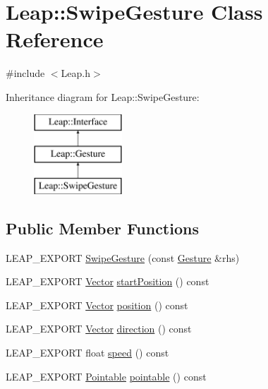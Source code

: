 \hypertarget{class_leap_1_1_swipe_gesture}{\section{Leap\+:\+:Swipe\+Gesture Class Reference}
\label{class_leap_1_1_swipe_gesture}
}


{\ttfamily \#include $<$Leap.\+h$>$}

Inheritance diagram for Leap\+:\+:Swipe\+Gesture\+:\begin{figure}[H]
\begin{center}
\leavevmode
\includegraphics[height=3.000000cm]{class_leap_1_1_swipe_gesture}
\end{center}
\end{figure}
\subsection*{Public Member Functions}
\begin{DoxyCompactItemize}
\item 
L\+E\+A\+P\+\_\+\+E\+X\+P\+O\+R\+T \hyperlink{class_leap_1_1_swipe_gesture_ac4698d7bf0a8ef15a92b00866a31fb7f}{Swipe\+Gesture} (const \hyperlink{class_leap_1_1_gesture}{Gesture} \&rhs)
\item 
L\+E\+A\+P\+\_\+\+E\+X\+P\+O\+R\+T \hyperlink{struct_leap_1_1_vector}{Vector} \hyperlink{class_leap_1_1_swipe_gesture_a273bcdcb7e67cdb1c35fc0a80c7dfabc}{start\+Position} () const 
\item 
L\+E\+A\+P\+\_\+\+E\+X\+P\+O\+R\+T \hyperlink{struct_leap_1_1_vector}{Vector} \hyperlink{class_leap_1_1_swipe_gesture_a14e074dad90fc86eec1144edce20c4bb}{position} () const 
\item 
L\+E\+A\+P\+\_\+\+E\+X\+P\+O\+R\+T \hyperlink{struct_leap_1_1_vector}{Vector} \hyperlink{class_leap_1_1_swipe_gesture_ab9fe4410a8bb19a993a514115a8fb161}{direction} () const 
\item 
L\+E\+A\+P\+\_\+\+E\+X\+P\+O\+R\+T float \hyperlink{class_leap_1_1_swipe_gesture_a8da056c9faa0a941f43d34f3a489ecc7}{speed} () const 
\item 
L\+E\+A\+P\+\_\+\+E\+X\+P\+O\+R\+T \hyperlink{class_leap_1_1_pointable}{Pointable} \hyperlink{class_leap_1_1_swipe_gesture_a51712b0e742448e3f51549e5300aceee}{pointable} () const 
\end{DoxyCompactItemize}
